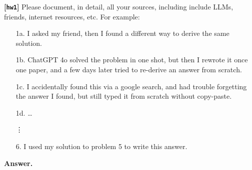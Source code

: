 \documentclass{article}
\def\hw{\textbf{[\texttt{hw1}]}\xspace}
\theoremstyle{definition}
\theoremstyle{remark}
\begin{document}
\begin{enumerate}[font={\Large\bfseries},left=0pt]
    \hw Please document, in detail, all your sources, including include LLMs, friends,
    internet resources, etc.  For example:
    \begin{enumerate}
      \item[1a.] I asked my friend, then I found a different way to derive the same solution.
      \item[1b.] ChatGPT 4o solved the problem in one shot, but then I rewrote it once one
        paper, and a few days later tried to re-derive an answer from scratch.
      \item[1c.] I accidentally found this via a google search,
        and had trouble forgetting the answer I found, but still typed it from scratch
        without copy-paste.
      \item[1d.] \dots
      \item[\vdots] 
      \item[6.] I used my solution to problem 5 to write this answer.
    \end{enumerate}

    \bigskip
    \textbf{Answer.}
\end{enumerate}
\clearpage


\end{document}
